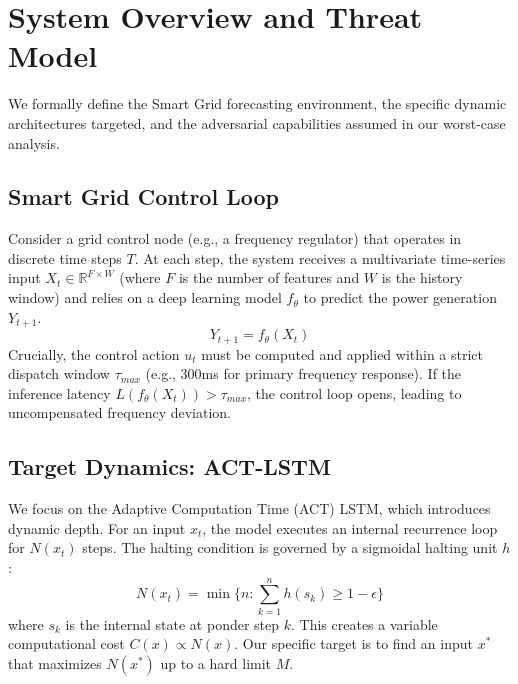 \section{System Overview and Threat Model}
\label{sec:threat_model}

We formally define the Smart Grid forecasting environment, the specific dynamic architectures targeted, and the adversarial capabilities assumed in our worst-case analysis.

\subsection{Smart Grid Control Loop}
Consider a grid control node (e.g., a frequency regulator) that operates in discrete time steps $T$. At each step, the system receives a multivariate time-series input $X_t \in \mathbb{R}^{F \times W}$ (where $F$ is the number of features and $W$ is the history window) and relies on a deep learning model $f_\theta$ to predict the power generation $Y_{t+1}$.
\begin{equation}
    Y_{t+1} = f_\theta(X_t)
\end{equation}
Crucially, the control action $u_t$ must be computed and applied within a strict dispatch window $\tau_{max}$ (e.g., 300ms for primary frequency response). If the inference latency $L(f_\theta(X_t)) > \tau_{max}$, the control loop opens, leading to uncompensated frequency deviation.

\subsection{Target Dynamics: ACT-LSTM}
We focus on the Adaptive Computation Time (ACT) LSTM, which introduces dynamic depth. For an input $x_t$, the model executes an internal recurrence loop for $N(x_t)$ steps. The halting condition is governed by a sigmoidal halting unit $h$:
\begin{equation}
    N(x_t) = \min \{ n : \sum_{k=1}^{n} h(s_k) \ge 1 - \epsilon \}
\end{equation}
where $s_k$ is the internal state at ponder step $k$. This creates a variable computational cost $C(x) \propto N(x)$. Our specific target is to find an input $x^*$ that maximizes $N(x^*)$ up to a hard limit $M$.

